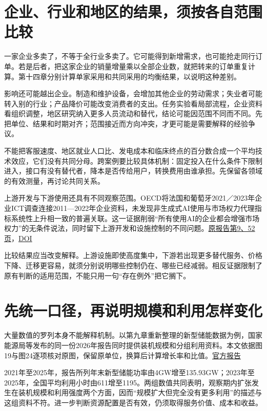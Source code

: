 \documentclass[UTF8,fontset=windows,12pt,a4paper,oneside,openany]{ctexbook}
\begin{document}
\section{企业、行业和地区的结果，须按各自范围比较}

一家企业多卖了，不等于全行业多卖了。它可能得到新增需求，也可能抢走同行订单。若是后者，把这家企业的销量增量乘以全部企业数，就把转来的订单重复计算。第十四章分别计算单家采用和共同采用的均衡结果，以说明这种差别。

影响还可能越出企业。制造和维护设备，会增加其他企业的劳动需求；失业者可能转入别的行业；产品降价可能改变消费者的支出。任务实验看局部流程，企业资料看组织调整，地区研究纳入更多人员流动和替代，结论可能因范围不同而不同。先把单位、结果和时期对齐；范围接近而方向冲突，才更可能是需要解释的经验争议。

不能把客服速度、地区就业人口比、发电成本和临床终点的百分数合成一个平均技术效应，它们没有共同分母。跨案例要比较具体机制：固定投入在什么条件下限制进入，接口有没有替代者，降本是否传给用户，转换费用由谁承担。先保留各领域的有效测量，再讨论共同关系。

上游开发与下游使用还具有不同观察范围。OECD将法国和葡萄牙2021／2023年企业ICT调查连接2011—2022年企业资料，未发现非生成式AI使用与市场权力代理指标系统性上升相一致的普遍关联。这一证据削弱“所有使用AI的企业都会增强市场权力”的无条件说法，同时留下上游开发和设施控制的不同问题。\href{https://www.oecd.org/content/dam/oecd/en/publications/reports/2026/07/competition-in-the-age-of-ai_e9f49e20/6f88a1ea-en.pdf}{原报告第9、52页}，\href{https://doi.org/10.1787/6f88a1ea-en}{DOI}

比较结果应当改变解释。上游设施即使高度集中，下游若出现更多替代服务、价格下降、迁移更容易，就须分别说明哪些控制仍在、哪些已经减弱。相反证据限制了原有判断的适用范围，不能只用一句“存在例外”把它搁下。

\section{先统一口径，再说明规模和利用怎样变化}

大量数值的罗列本身不能解释机制。以第九章重新整理的新型储能数据为例，国家能源局等发布的同一份2026年报告同时提供装机规模和分组利用资料。本文依据图19与图24逐项核对原图，保留原单位，换算后计算增长率和比值。\href{https://www.nea.gov.cn/20260730/0a1e9823b7a14e8ba16e82c34b3bea2b/202607300a1e9823b7a14e8ba16e82c34b3bea2b_270e42e93bb1a647609c851527f42364ee.pdf}{官方报告}

2021年至2025年，报告所列年末新型储能功率由4GW增至135.93GW；2023年至2025年，全国平均利用小时由611增至1195。两组数值共同表明，观察期内扩张发生在装机规模和利用强度两个方面，因而“规模扩大但完全没有更多利用”的描述与这组资料不符。进一步判断资源配置是否有效，仍须取得服务价值、成本和收益。
\end{document}
